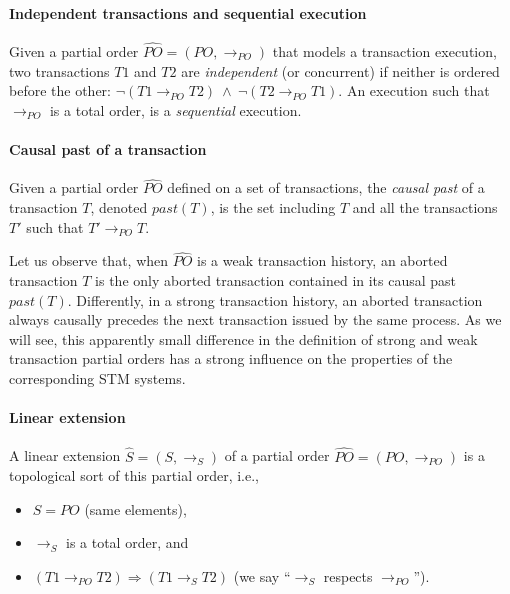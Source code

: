 \paragraph{Independent transactions and sequential execution}
Given a partial order $\widehat{PO}=(PO,\rightarrow_{PO})$
that models a transaction execution, two transactions $T1$ and $T2$ are 
{\it independent} (or concurrent) if  neither is ordered before the other:  
$\neg(T1 \rightarrow_\mathit{PO} T2)~\wedge~ 
\neg(T2 \rightarrow_\mathit{PO} T1)$. 
An  execution  such that  $\rightarrow_\mathit{PO}$ is a total order, 
is a {\it sequential} execution.  



\paragraph{Causal past of a transaction}
Given a partial order  $\widehat{PO}$ defined on  a set of transactions, the 
{\it  causal past}  of a  transaction $T$,  denoted $past(T)$,  is  the set
including $T$ and all the transactions $T'$  such that 
$T' \rightarrow_\mathit{PO} T$. 

Let us observe that, when   $\widehat{PO}$  is a weak transaction history, 
an  aborted transaction $T$  is   the only aborted transaction contained in
its causal past $past(T)$.  Differently, in a strong transaction history, 
an aborted transaction always causally precedes the next transaction 
issued  by the  same  process.  As we will see, this apparently  small   
difference in the definition  of strong and weak transaction partial  
orders has a  strong influence on the  properties of the corresponding 
STM systems. 





\paragraph{Linear extension}
A linear extension  $\widehat{S}=(S,\rightarrow_{S})$ of a partial order 
$\widehat{PO}=(PO,\rightarrow_{PO})$ is a topological sort of
this partial order, i.e., 
%
\begin{itemize}
\vspace{-0.2cm}
\item $S=PO$ (same elements), 
%
\vspace{-0.2cm}
\item $\rightarrow_S$ is a total order, and 
%
\vspace{-0.2cm}
\item $(T1 \rightarrow_{PO} T2)  \Rightarrow (T1 \rightarrow_S T2)$ 
(we say  ``$\rightarrow_S$ respects $\rightarrow_{PO}$''). 
\end{itemize}
\vspace{-0.2cm}



